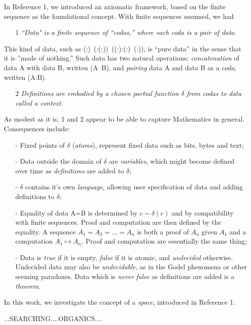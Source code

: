 \documentclass[11pt]{article}
\begin{document}
In Reference 1, we introduced an axiomatic framework, based on the finite sequence as the foundational concept.  
With finite sequences assumed, we had 
\begin{itemize}
\item[1 ]{\it ``Data" is a finite sequence of ``codas,'' where each coda is a pair of data.}
\end{itemize}
\noindent This kind of data, such as (:)\ (:(:))\ ((:):(:)\ (:)), is ``pure data'' in the sense that it is ''made of nothing.'' Such data has two natural operations: 
{\it concatenation} of data A with data B, written (A\ B), and {\it pairing} data A and data B as a {\it coda}, written (A:B).  
\begin{itemize}
\item[2 ]{\it Definitions are embodied by a chosen partial function $\delta$ from codas to data called a context.}
\end{itemize}
As modest as it is, 1 and 2 appear to be able to capture Mathematics in general.  Consequences include:   
\begin{itemize}
\item[-]{Fixed points of $\delta$ ({\it atoms}), represent fixed data such as bits, bytes and text;}
\item[-]{Data outside the domain of $\delta$ are {\it variables}, which might become defined over time as {\it definitions} are added to $\delta$;} 
\item[-]{$\delta$ contains it's own {\it language}, allowing user specification of data and adding definitions to $\delta$;} 
\item[-]{Equality of data A=B is determined by $c\sim\delta(c)$ and by compatibility with finite sequences. Proof and computation are then defined by the equality.  A sequence $A_1=A_2=\dots=A_n$ is both a proof of $A_n$ given $A_1$ and a computation $A_1\mapsto A_n$.  Proof and computation are essentially the same thing;}
\item[-]{Data is {\it true} if it is empty, {\it false} if it is atomic, and {\it undecided} otherwise.  Undecided data may also be {\it undecidable}, as in the Godel phenomena or other seeming paradoxes.  Data which is {\it never false} as definitions are added is a {\it theorem}.}
\end{itemize}

In this work, we investigate the concept of a {\it space}, introduced in Reference 1.  


...SEARCHING....ORGANICS....
\end{document}
